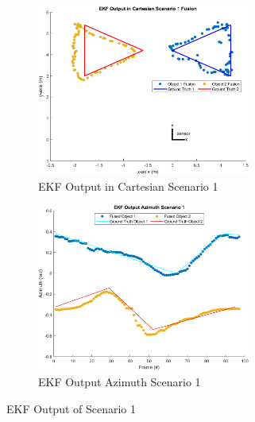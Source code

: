 \begin{figure}[!htb]
    \hspace{0.1\textwidth}
    \begin{subfigure}[b]{0.3\textwidth}%
        \includegraphics[width=7cm]{Figures/matlab/EKF Output in Cartesian Scenario 1.png}
        \caption{EKF Output in Cartesian Scenario 1}
        \label{subfig:ekf_cart_1}
    \end{subfigure}
    \hspace{0.15\textwidth}
    \begin{subfigure}[b]{0.3\textwidth}%
        \includegraphics[width=7cm]{Figures/matlab/EKF Output Azimuth Scenario 1.png}
        \caption{EKF Output Azimuth Scenario 1}
        \label{subfig:ekf_azi_1}
    \end{subfigure}

    \caption{EKF Output of Scenario 1}
    \label{fig:ekf_1}
\end{figure}

